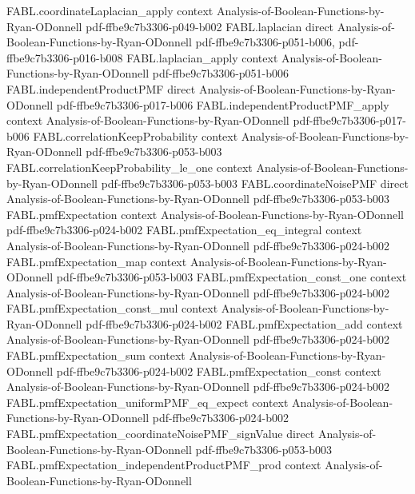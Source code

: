 \begin{theorem}
  {FABL.coordinateLaplacian_apply}
  {context}
  {Analysis-of-Boolean-Functions-by-Ryan-ODonnell}
  {pdf-ffbe9c7b3306-p049-b002}
\proofstep
  {FABL.laplacian}
  {direct}
  {Analysis-of-Boolean-Functions-by-Ryan-ODonnell}
  {pdf-ffbe9c7b3306-p051-b006,
    pdf-ffbe9c7b3306-p016-b008}
\proofstep
  {FABL.laplacian_apply}
  {context}
  {Analysis-of-Boolean-Functions-by-Ryan-ODonnell}
  {pdf-ffbe9c7b3306-p051-b006}
\proofstep
  {FABL.independentProductPMF}
  {direct}
  {Analysis-of-Boolean-Functions-by-Ryan-ODonnell}
  {pdf-ffbe9c7b3306-p017-b006}
\proofstep
  {FABL.independentProductPMF_apply}
  {context}
  {Analysis-of-Boolean-Functions-by-Ryan-ODonnell}
  {pdf-ffbe9c7b3306-p017-b006}
\proofstep
  {FABL.correlationKeepProbability}
  {context}
  {Analysis-of-Boolean-Functions-by-Ryan-ODonnell}
  {pdf-ffbe9c7b3306-p053-b003}
\proofstep
  {FABL.correlationKeepProbability_le_one}
  {context}
  {Analysis-of-Boolean-Functions-by-Ryan-ODonnell}
  {pdf-ffbe9c7b3306-p053-b003}
\proofstep
  {FABL.coordinateNoisePMF}
  {direct}
  {Analysis-of-Boolean-Functions-by-Ryan-ODonnell}
  {pdf-ffbe9c7b3306-p053-b003}
\proofstep
  {FABL.pmfExpectation}
  {context}
  {Analysis-of-Boolean-Functions-by-Ryan-ODonnell}
  {pdf-ffbe9c7b3306-p024-b002}
\proofstep
  {FABL.pmfExpectation_eq_integral}
  {context}
  {Analysis-of-Boolean-Functions-by-Ryan-ODonnell}
  {pdf-ffbe9c7b3306-p024-b002}
\proofstep
  {FABL.pmfExpectation_map}
  {context}
  {Analysis-of-Boolean-Functions-by-Ryan-ODonnell}
  {pdf-ffbe9c7b3306-p053-b003}
\proofstep
  {FABL.pmfExpectation_const_one}
  {context}
  {Analysis-of-Boolean-Functions-by-Ryan-ODonnell}
  {pdf-ffbe9c7b3306-p024-b002}
\proofstep
  {FABL.pmfExpectation_const_mul}
  {context}
  {Analysis-of-Boolean-Functions-by-Ryan-ODonnell}
  {pdf-ffbe9c7b3306-p024-b002}
\proofstep
  {FABL.pmfExpectation_add}
  {context}
  {Analysis-of-Boolean-Functions-by-Ryan-ODonnell}
  {pdf-ffbe9c7b3306-p024-b002}
\proofstep
  {FABL.pmfExpectation_sum}
  {context}
  {Analysis-of-Boolean-Functions-by-Ryan-ODonnell}
  {pdf-ffbe9c7b3306-p024-b002}
\proofstep
  {FABL.pmfExpectation_const}
  {context}
  {Analysis-of-Boolean-Functions-by-Ryan-ODonnell}
  {pdf-ffbe9c7b3306-p024-b002}
\proofstep
  {FABL.pmfExpectation_uniformPMF_eq_expect}
  {context}
  {Analysis-of-Boolean-Functions-by-Ryan-ODonnell}
  {pdf-ffbe9c7b3306-p024-b002}
\proofstep
  {FABL.pmfExpectation_coordinateNoisePMF_signValue}
  {direct}
  {Analysis-of-Boolean-Functions-by-Ryan-ODonnell}
  {pdf-ffbe9c7b3306-p053-b003}
\proofstep
  {FABL.pmfExpectation_independentProductPMF_prod}
  {context}
  {Analysis-of-Boolean-Functions-by-Ryan-ODonnell}

\end{theorem}
